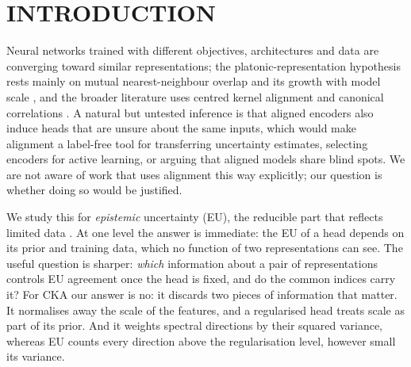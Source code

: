 \documentclass[twoside]{article}
\theoremstyle{definition}
\theoremstyle{remark}
\begin{document}
\section{INTRODUCTION}

Neural networks trained with different objectives, architectures and data are converging toward similar representations; the platonic-representation hypothesis rests mainly on mutual nearest-neighbour overlap and its growth with model scale \citep{huh2024platonic}, and the broader literature uses centred kernel alignment \citep[CKA;][]{kornblith2019similarity} and canonical correlations \citep{raghu2017svcca,morcos2018insights}.
A natural but untested inference is that aligned encoders also induce heads that are unsure about the same inputs, which would make alignment a label-free tool for transferring uncertainty estimates, selecting encoders for active learning, or arguing that aligned models share blind spots.
We are not aware of work that uses alignment this way explicitly; our question is whether doing so would be justified.

We study this for \emph{epistemic} uncertainty (EU), the reducible part that reflects limited data \citep{kendall2017uncertainties,hullermeier2021aleatoric}.
At one level the answer is immediate: the EU of a head depends on its prior and training data, which no function of two representations can see.
The useful question is sharper: \emph{which} information about a pair of representations controls EU agreement once the head is fixed, and do the common indices carry it?
For CKA our answer is no: it discards two pieces of information that matter.
It normalises away the scale of the features, and a regularised head treats scale as part of its prior.
And it weights spectral directions by their squared variance, whereas EU counts every direction above the regularisation level, however small its variance.
\end{document}
